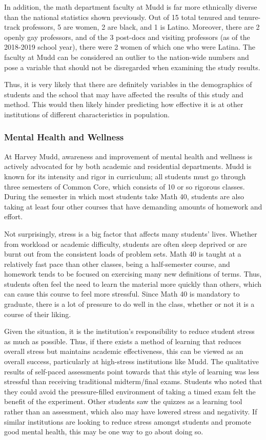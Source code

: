 In addition, the math department faculty at Mudd is far more ethnically diverse than the national statistics shown previously. Out of 15 total tenured and tenure-track professors, 5 are women, 2 are black, and 1 is Latino. Moreover, there are 2 openly gay professors, and of the 3 post-docs and visiting professors (as of the 2018-2019 school year), there were 2 women of which one who were Latina. The faculty at Mudd can be considered an outlier to the nation-wide numbers and pose a variable that should not be disregarded when examining the study results.

Thus, it is very likely that there are definitely variables in the demographics of students and the school that may have affected the results of this study and method. This would then likely hinder predicting how effective it is at other institutions of different characteristics in population.

\subsubsection{Mental Health and Wellness}
At Harvey Mudd, awareness and improvement of mental health and wellness is actively advocated for by both academic and residential departments. Mudd is known for its intensity and rigor in curriculum; all students must go through three semesters of Common Core, which consists of 10 or so rigorous classes. During the semester in which most students take Math 40, students are also taking at least four other courses that have demanding amounts of homework and effort.

Not surprisingly, stress is a big factor that affects many students' lives. Whether from workload or academic difficulty, students are often sleep deprived or are burnt out from the consistent loads of problem sets. Math 40 is taught at a relatively fast pace than other classes, being a half-semester course, and homework tends to be focused on exercising many new definitions of terms. Thus, students often feel the need to learn the material more quickly than others, which can cause this course to feel more stressful. Since Math 40 is mandatory to graduate, there is a lot of pressure to do well in the class, whether or not it is a course of their liking.

Given the situation, it is the institution's responsibility to reduce student stress as much as possible. Thus, if there exists a method of learning that reduces overall stress but maintains academic effectiveness, this can be viewed as an overall success, particularly at high-stress institutions like Mudd. The qualitative results of self-paced assessments point towards that this style of learning was less stressful than receiving traditional midterm/final exams. Students who noted that they could avoid the pressure-filled environment of taking a timed exam felt the benefit of the experiment. Other students saw the quizzes as a learning tool rather than an assessment, which also may have lowered stress and negativity. If similar institutions are looking to reduce stress amongst students and promote good mental health, this may be one way to go about doing so.

